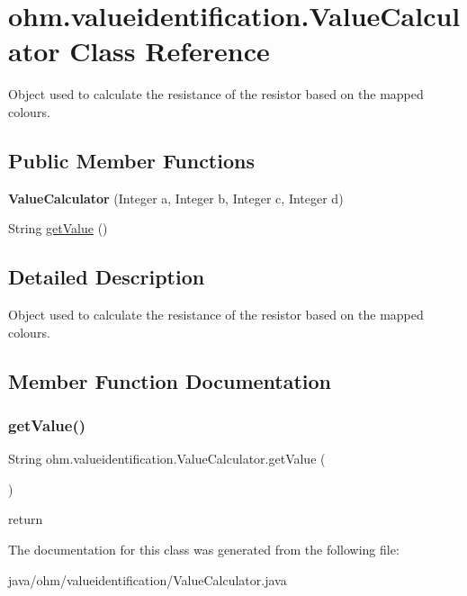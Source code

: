 \hypertarget{classohm_1_1valueidentification_1_1_value_calculator}{}\section{ohm.\+valueidentification.\+Value\+Calculator Class Reference}
\label{classohm_1_1valueidentification_1_1_value_calculator}


Object used to calculate the resistance of the resistor based on the mapped colours.  


\subsection*{Public Member Functions}
\begin{DoxyCompactItemize}
\item 
\hypertarget{classohm_1_1valueidentification_1_1_value_calculator_a8f01d25909c7b2381bb3abb3c6f7dfb4}{}\label{classohm_1_1valueidentification_1_1_value_calculator_a8f01d25909c7b2381bb3abb3c6f7dfb4} 
{\bfseries Value\+Calculator} (Integer a, Integer b, Integer c, Integer d)
\item 
String \hyperlink{classohm_1_1valueidentification_1_1_value_calculator_af4c4224b8750c70a5d656e6ab3e75274}{get\+Value} ()
\end{DoxyCompactItemize}


\subsection{Detailed Description}
Object used to calculate the resistance of the resistor based on the mapped colours. 

\subsection{Member Function Documentation}
\hypertarget{classohm_1_1valueidentification_1_1_value_calculator_af4c4224b8750c70a5d656e6ab3e75274}{}\label{classohm_1_1valueidentification_1_1_value_calculator_af4c4224b8750c70a5d656e6ab3e75274} 
\subsubsection{\texorpdfstring{get\+Value()}{getValue()}}
{\footnotesize\ttfamily String ohm.\+valueidentification.\+Value\+Calculator.\+get\+Value (\begin{DoxyParamCaption}{ }\end{DoxyParamCaption})}

return

The documentation for this class was generated from the following file\+:\begin{DoxyCompactItemize}
\item 
java/ohm/valueidentification/Value\+Calculator.\+java\end{DoxyCompactItemize}
